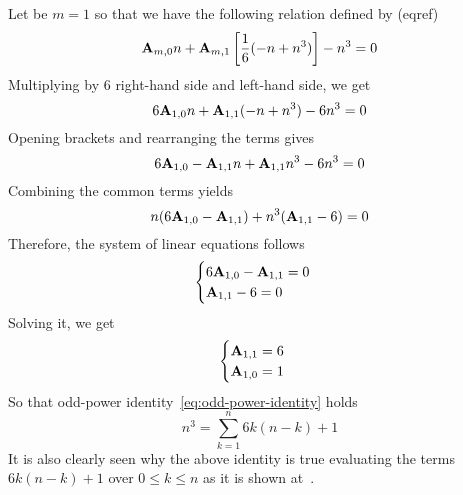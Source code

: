 \begin{examp}
    Let be $m=1$ so that we have the following relation defined by (eqref)
    \begin{equation*}
        {\mathbf{A}} \sb{m,0} n + {\mathbf{A}} \sb{m,1} \left[ \frac{1}{6} (-n + n^3) \right] -n^3 = 0
    \end{equation*}
    Multiplying by $6$ right-hand side and left-hand side, we get
    \begin{equation*}
        6{\mathbf{A}} \sb{1,0} n + {\mathbf{A}} \sb{1,1} (-n + n^3) - 6n^3 = 0
    \end{equation*}
    Opening brackets and rearranging the terms gives
    \begin{equation*}
        6 {\mathbf{A}} \sb{1,0} - {\mathbf{A}} \sb{1,1} n + {\mathbf{A}} \sb{1,1} n^3 - 6n^3 = 0
    \end{equation*}
    Combining the common terms yields
    \begin{equation*}
        n(6{\mathbf{A}} \sb{1,0} - {\mathbf{A}} \sb{1,1}) + n^3 ({\mathbf{A}} \sb{1,1} - 6) = 0
    \end{equation*}
    Therefore, the system of linear equations follows
    \begin{equation*}
        \begin{cases}
            6 {\mathbf{A}} \sb{1,0} - {\mathbf{A}} \sb{1,1} = 0 \\
            {\mathbf{A}} \sb{1,1} - 6 = 0
        \end{cases}
    \end{equation*}
    Solving it, we get
    \begin{equation*}
        \begin{cases}
            {\mathbf{A}} \sb{1,1} = 6 \\
            {\mathbf{A}} \sb{1,0} = 1
        \end{cases}
    \end{equation*}
    So that odd-power identity~\eqref{eq:odd-power-identity} holds
    \begin{equation*}
        n^3 = \sum_{k=1}^{n} 6k(n-k) + 1
    \end{equation*}
    It is also clearly seen why the above identity is true evaluating the terms $6k(n-k) + 1$ over $0 \leq k \leq n$ as
    it is shown at~\cite{kolosov2017third}.
\end{examp}